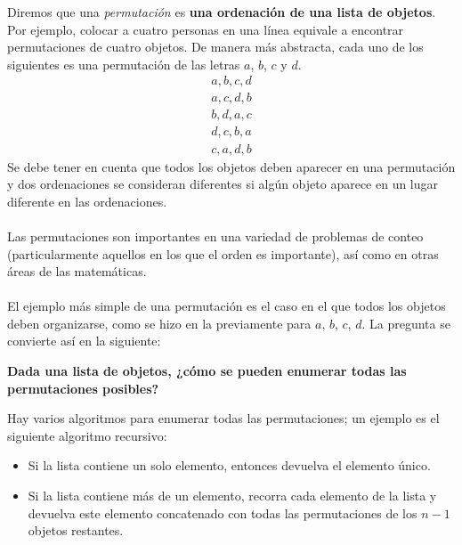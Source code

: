 \documentclass[12pt]{article}
\begin{document}
Diremos que una \textit{permutación} es \textbf{una ordenación de una lista de objetos}. Por ejemplo, colocar a cuatro personas en una línea equivale a encontrar permutaciones de cuatro objetos. De manera más abstracta, cada uno de los siguientes es una permutación de las letras $a$, $b$, $c$ y $d$.
\begin{eqnarray*}
    a,b,c,d\\
    a,c,d,b\\
    b,d,a,c\\
    d,c,b,a\\
    c,a,d,b
\end{eqnarray*}
Se debe tener en cuenta que todos los objetos deben aparecer en una permutación y dos ordenaciones se consideran diferentes si algún objeto aparece en un lugar diferente en las ordenaciones.\\\\
Las permutaciones son importantes en una variedad de problemas de conteo (particularmente aquellos en los que el orden es importante), así como en otras áreas de las matemáticas.\\\\
El ejemplo más simple de una permutación es el caso en el que todos los objetos deben organizarse, como se hizo en la previamente para $a$, $b$, $c$, $d$. La pregunta se convierte así en la siguiente:
\begin{center}
    \textbf{Dada una lista de objetos, ¿cómo se pueden enumerar todas las permutaciones posibles?}
\end{center}
Hay varios algoritmos para enumerar todas las permutaciones; un ejemplo es el siguiente algoritmo recursivo:
\begin{itemize}
    \item Si la lista contiene un solo elemento, entonces devuelva el elemento único.
    \item Si la lista contiene más de un elemento, recorra cada elemento de la lista y devuelva este elemento concatenado con todas las permutaciones de los $n-1$ objetos restantes.
\end{itemize}
\end{document}
